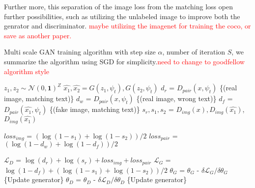 \documentclass[10pt,twocolumn,letterpaper]{article}
\begin{document}
Further more, this separation of the image loss from the matching loss open further possibilities, such as utilizing the unlabeled image to improve both the genrator and discriminator. \textcolor{red}{maybe utilizing the imagenet for training the coco, or save as another paper.}


 \begin{algorithm}
 	\caption{Multi scale GAN training algorithm with step size $\alpha$, number of iteration $S$, we summarize the algorithm using SGD for simplicity.\textcolor{red}{need to change to goodfellow algorithm style}}
 	\label{CHalgorithm}
 	\begin{algorithmic}[1]
 		
 		\State $z_1, z_2 \sim \mathcal{N}(0,\bm{1})^Z$
 		\State $\hat{x_1}, \hat{x_2} = G(z_1, \psi_t),  G(z_2, \psi_{\hat{t}})$ %
 		\State $d_r$ = $D_{pair}(x, \psi_t)$ \{(real image, matching text)\}
 		\State $d_w$ = $D_{pair}(x, \psi_{\hat{t}})$ \{(real image, wrong text)\}
 		\State $d_f$ = $D_{pair}(\hat{x_1}, \psi_t)$ \{(fake image, matching text)\}
 		\State $s_r, s_1, s_2$ = $D_{img}(x), D_{img}(\hat{x_1})$, $D_{img}(\hat{x_1})$ %
 		
 		\State $loss_{img}$ = $ (\log(1-s_1) + \log(1-s_2))/2 $
 		\State $loss_{pair}$ = $ (\log(1-d_w) + \log(1-d_f))/2 $
 		
 		\State $\mathcal{L}_{D}$ = $\log(d_r) + \log(s_r) +loss_{img} + loss_{pair}$
 		\State $\mathcal{L}_{G}$ = $\log(1-d_f) +  ( \log(1-s_1) + \log(1-s_2) )/2 $
 		\State $\theta_G$ = $\theta_G$ - ${\delta \mathcal{L}_G } / {\delta \theta_G}$  \{Update generator\}
 		\State $\theta_D$ = $\theta_D$ - ${\delta \mathcal{L}_D} / {\delta \theta_D}$  \{Update generator\}
 		
 		\EndFor
 		
 	\end{algorithmic}
 \end{algorithm}
 
\end{document}

